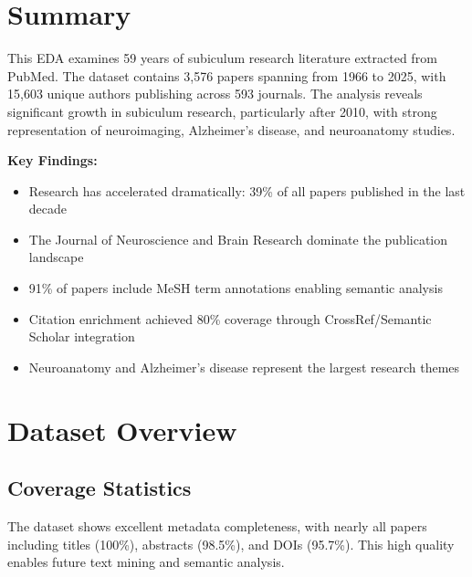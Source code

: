 \documentclass{../latex/analysis_report}
\begin{document}
\maketitle

\section{Summary}

This EDA examines 59 years of subiculum research literature extracted from PubMed. The dataset contains 3,576 papers spanning from 1966 to 2025, with 15,603 unique authors publishing across 593 journals. The analysis reveals significant growth in subiculum research, particularly after 2010, with strong representation of neuroimaging, Alzheimer's disease, and neuroanatomy studies.

\vspace{8pt}
\noindent\textbf{Key Findings:}
\vspace{-2pt}
\begin{itemize}[noitemsep,topsep=0pt]
    \item Research has accelerated dramatically: 39\% of all papers published in the last decade
    \item The Journal of Neuroscience and Brain Research dominate the publication landscape
    \item 91\% of papers include MeSH term annotations enabling semantic analysis
    \item Citation enrichment achieved 80\% coverage through CrossRef/Semantic Scholar integration
    \item Neuroanatomy and Alzheimer's disease represent the largest research themes
\end{itemize}

\section{Dataset Overview}

\subsection{Coverage Statistics}

The dataset shows excellent metadata completeness, with nearly all papers including titles (100\%), abstracts (98.5\%), and DOIs (95.7\%). This high quality enables future text mining and semantic analysis.
\end{document}
